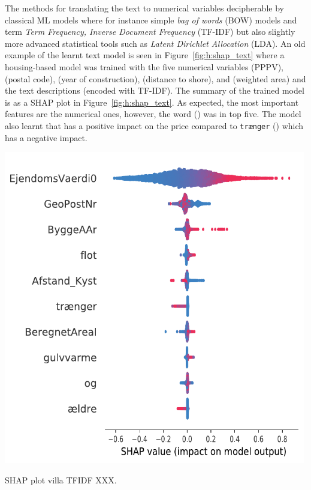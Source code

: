 The methods for translating the text to numerical variables decipherable by classical ML models where for instance simple \emph{bag of words} (BOW) models and term \emph{Term Frequency, Inverse Document Frequency} (TF-IDF) but also slightly more advanced statistical tools such as \emph{Latent Dirichlet Allocation} (LDA). An old example of the learnt text model is seen in Figure~\ref{fig:h:shap_text} where a housing-based model was trained with the five numerical variables  (PPPV),  (postal code),  (year of construction),  (distance to shore), and  (weighted area) and the text descriptions (encoded with TF-IDF). The summary of the trained model is as a SHAP plot in Figure~\ref{fig:h:shap_text}. As expected, the most important features are the numerical ones, however, the word  () was in top five. The model also learnt that  has a positive impact on the price compared to \colorbox{light-gray}{\texttt{trænger}} () which has a negative impact.

\begin{marginfigure}
  \includegraphics[width=0.99\textwidth]{figures/housing_text/villa_tfidf.pdf}
  \caption[SHAP plot villa TFIDF XXX]{SHAP plot villa TFIDF XXX.}
  \label{fig:h:shap_text}
\end{marginfigure}

